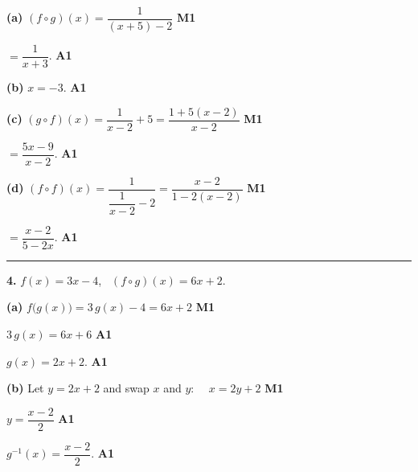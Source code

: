 \documentclass[12pt, twoside]{article}
\begin{document}
\textbf{(a)} $(f \circ g)(x)=\dfrac{1}{(x+5)-2}$ \hfill \textbf{M1}

$=\dfrac{1}{x+3}$. \hfill \textbf{A1}

\medskip

\textbf{(b)} $x=-3$. \hfill \textbf{A1}

\medskip

\textbf{(c)} $(g \circ f)(x)=\dfrac{1}{x-2}+5=\dfrac{1+5(x-2)}{x-2}$ \hfill \textbf{M1}

$=\dfrac{5x-9}{x-2}$. \hfill \textbf{A1}

\medskip

\textbf{(d)} $(f \circ f)(x)=\dfrac{1}{\dfrac{1}{x-2}-2}=\dfrac{x-2}{1-2(x-2)}$ \hfill \textbf{M1}

$=\dfrac{x-2}{5-2x}$. \hfill \textbf{A1}

\bigskip\hrule\bigskip

\noindent\textbf{4.} $f(x)=3x-4$, \ $(f \circ g)(x)=6x+2$.

\medskip

\textbf{(a)} $f\big(g(x)\big)=3\,g(x)-4=6x+2$ \hfill \textbf{M1}

$3\,g(x)=6x+6$ \hfill \textbf{A1}

$g(x)=2x+2$. \hfill \textbf{A1}

\medskip

\textbf{(b)} Let $y=2x+2$ and swap $x$ and $y$: \ \ $x=2y+2$ \hfill \textbf{M1}

$y=\dfrac{x-2}{2}$ \hfill \textbf{A1}

$g^{-1}(x)=\dfrac{x-2}{2}$. \hfill \textbf{A1}
\end{document}
